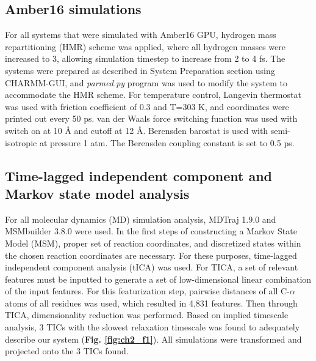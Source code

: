 \subsection{Amber16 simulations}
For all systems that were simulated with Amber16 GPU, hydrogen mass repartitioning (HMR) scheme was applied, where all hydrogen masses were increased to 3, allowing simulation timestep to increase from 2 to 4 fs. The systems were prepared as described in System Preparation section using CHARMM-GUI, and \textit{parmed.py} program was used to modify the system to accommodate the HMR scheme. For temperature control, Langevin thermostat was used with friction coefficient of 0.3 and T=303 K, and coordinates were printed out every 50 ps. van der Waals force switching function was used with switch on at 10 Å and cutoff at 12 Å. Berensden barostat is used with semi-isotropic at pressure 1 atm. The Berensden coupling constant is set to 0.5 ps.

\subsection{Time-lagged independent component and Markov state model analysis}
For all molecular dynamics (MD) simulation analysis, MDTraj 1.9.0 and MSMbuilder 3.8.0 were used. \citep{harrigan2017, mcgibbon2015} In the first steps of constructing a Markov State Model (MSM), proper set of reaction coordinates, and discretized states within the chosen reaction coordinates are necessary. For these purposes, time-lagged independent component analysis (tICA) was used. For TICA, a set of relevant features must be inputted to generate a set of low-dimensional linear combination of the input features. For this featurization step, pairwise distances of all C-$\alpha$ atoms of all residues was used, which resulted in 4,831 features. Then through TICA, dimensionality reduction was performed. Based on implied timescale analysis, 3 TICs with the slowest relaxation timescale was found to adequately describe our system (\textbf{Fig. \ref{fig:ch2_f1}}). All simulations were transformed and projected onto the 3 TICs found.

